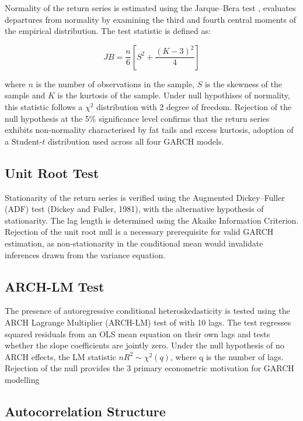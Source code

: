 Normality of the return series is estimated 
using the Jarque--Bera test \citep{jarque1980}, 
evaluates departures from normality by 
examining the third and fourth central moments of the empirical 
distribution. The test statistic is defined as:

\begin{equation}
JB = \frac{n}{6} \left[ S^2 + \frac{(K - 3)^2}{4} \right]
\end{equation}

where $n$ is the number of observations in the sample, $S$ is the skewness of the sample and $K$ is the kurtosis of the sample. Under null hypothises of normality, this statistic follows a $\chi^2$ distribution with 2 degree of freedom. Rejection of the null hypothesis at the 5\% significance level confirms that the return series exhibits non-normality characterised by fat tails and excess kurtosis,  adoption of a Student-$t$  distribution used across all four GARCH models.

\subsection{Unit Root Test}
Stationarity of the return series is verified using the Augmented Dickey–Fuller (ADF) test (Dickey and Fuller, 1981), with the alternative hypothesis of stationarity. The lag length is determined using the Akaike Information Criterion. Rejection of the unit root null is a necessary prerequisite for valid GARCH estimation, as non-stationarity in the conditional mean would invalidate inferences drawn from the variance equation.

\subsection{ARCH-LM Test}

The presence of autoregressive conditional heteroskedasticity is tested using the ARCH
Lagrange Multiplier (ARCH-LM) test of \cite{engle1982} with 10 lags. The test regresses
squared residuals from an OLS mean equation on their own lags and tests whether the
slope coefficients are jointly zero. Under the null hypothesis of no ARCH effects, the LM
statistic $nR^2 \sim \chi^2(q)$, where q is the number of lags. Rejection of the null provides the
3
primary econometric motivation for GARCH modelling

\subsection{Autocorrelation Structure }


